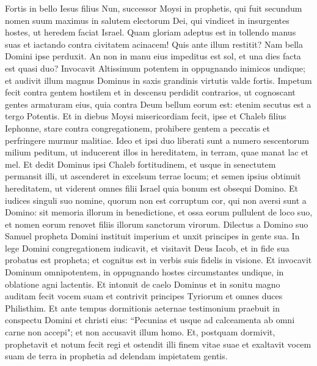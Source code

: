 \begin{biblechapter}  
\verse Fortis in bello Iesus filius Nun, successor Moysi in prophetis, qui fuit secundum nomen suum 
\verse maximus in salutem electorum Dei, qui vindicet in insurgentes hostes, ut heredem faciat Israel. 
\verse Quam gloriam adeptus est in tollendo manus suas et iactando contra civitatem acinacem! 
\verse Quis ante illum restitit? Nam bella Domini ipse perduxit. 
\verse An non in manu eius impeditus est sol, et una dies facta est quasi duo? 
\verse Invocavit Altissimum potentem in oppugnando inimicos undique; et audivit illum magnus Dominus in saxis grandinis virtutis valde fortis. 
\verse Impetum fecit contra gentem hostilem et in descensu perdidit contrarios, 
\verse ut cognoscant gentes armaturam eius, quia contra Deum bellum eorum est: etenim secutus est a tergo Potentis. 
\verse Et in diebus Moysi misericordiam fecit, ipse et Chaleb filius Iephonne, stare contra congregationem, prohibere gentem a peccatis et perfringere murmur malitiae. 
\verse Ideo et ipsi duo liberati sunt a numero sescentorum milium peditum, ut inducerent illos in hereditatem, in terram, quae manat lac et mel. 
\verse Et dedit Dominus ipsi Chaleb fortitudinem, et usque in senectutem permansit illi, ut ascenderet in excelsum terrae locum; et semen ipsius obtinuit hereditatem, 
\verse ut viderent omnes filii Israel quia bonum est obsequi Domino. 
\verse Et iudices singuli suo nomine, quorum non est corruptum cor, qui non aversi sunt a Domino: 
\verse sit memoria illorum in benedictione, et ossa eorum pullulent de loco suo, 
\verse et nomen eorum renovet filiis illorum sanctorum virorum. 
\verse Dilectus a Domino suo Samuel propheta Domini instituit imperium et unxit principes in gente sua. 
\verse In lege Domini congregationem iudicavit, et visitavit Deus Iacob, et in fide sua probatus est propheta; 
\verse et cognitus est in verbis suis fidelis in visione. 
\verse Et invocavit Dominum omnipotentem, in oppugnando hostes circumstantes undique, in oblatione agni lactentis. 
\verse Et intonuit de caelo Dominus et in sonitu magno auditam fecit vocem suam 
\verse et contrivit principes Tyriorum et omnes duces Philisthim. 
\verse Et ante tempus dormitionis aeternae testimonium praebuit in conspectu Domini et christi eius: “Pecunias et usque ad calceamenta ab omni carne non accepi"; et non accusavit illum homo. 
\verse Et, postquam dormivit, prophetavit et notum fecit regi et ostendit illi finem vitae suae et exaltavit vocem suam de terra in prophetia ad delendam impietatem gentis. 
\end{biblechapter}

